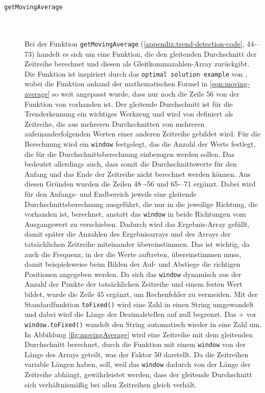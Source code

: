 \begin{description}
\item[\texttt{getMovingAverage}]\hfill \\\\
Bei der Funktion \texttt{getMovingAverage} (\ref{appendix:trend-detection-code}, 44-–73) handelt es sich um eine Funktion, die den gleitenden Durchschnitt der Zeitreihe berechnet und diesen als Gleitkommazahlen-Array zurückgibt. Die Funktion ist inspiriert durch das \texttt{optimal solution example} von \cite{RichardBevan.}, wobei die Funktion anhand der mathematischen Formel in \ref{eqn:moving-average} so weit angepasst wurde, dass nur noch die Zeile 56 von der Funktion von \cite{RichardBevan.} vorhanden ist. Der gleitende Durchschnitt ist für die Trenderkennung ein wichtiges Werkzeug \cite{Wiesbaden.2013} und wird von \cite{Hyndman.2011} definiert als Zeitreihe, die aus mehreren Durchschnitten von mehreren aufeinanderfolgenden Werten einer anderen Zeitreihe gebildet wird. Für die Berechnung wird ein \texttt{window} festgelegt, das die Anzahl der Werte festlegt, die für die Durchschnittsberechnung einbezogen werden sollen. Das bedeutet allerdings auch, dass somit die Durchschnittswerte für den Anfang und das Ende der Zeitreihe nicht berechnet werden können. Aus diesen Gründen wurden die Zeilen 48–-56 und 65-–71 ergänzt. Dabei wird für den Anfangs- und Endbereich jeweils eine gleitende Durchschnittsberechnung ausgeführt, die nur in die jeweilige Richtung, die vorhanden ist, berechnet, anstatt das \texttt{window} in beide Richtungen vom Ausgangswert zu verschieben. Dadurch wird das Ergebnis-Array gefüllt, damit später die Anzahlen des Ergebnisarrays und des Arrays der tatsächlichen Zeitreihe miteinander übereinstimmen. Das ist wichtig, da auch die Frequenz, in der die Werte auftreten, übereinstimmen muss, damit beispielsweise beim Bilden der Auf- und Abstiege die richtigen Positionen angegeben werden.  Da sich das \texttt{window} dynamisch aus der Anzahl der Punkte der tatsächlichen Zeitreihe und einem festen Wert bildet, wurde die Zeile 45 ergänzt, um Rechenfehler zu vermeiden. Mit der Standardfunktion \texttt{toFixed()} wird eine Zahl in einen String umgewandelt und dabei wird die Länge der Dezimalstellen auf null begrenzt. Das + vor \texttt{window.toFixed()} wandelt den String automatisch wieder in eine Zahl um. In Abbildung \ref{fig:movingAverage} wird eine Zeitreihe mit dem gleitenden Durchschnitt berechnet, durch die Funktion mit einem \texttt{window} von der Länge des Arrays geteilt, was der Faktor 50 darstellt. Da die Zeitreihen variable Längen haben, soll, weil das \texttt{window} dadurch von der Länge der Zeitreihe abhängt, gewährleistet werden, dass der gleitende Durchschnitt sich verhältnismäßig bei allen Zeitreihen gleich verhält. 


\end{description}
